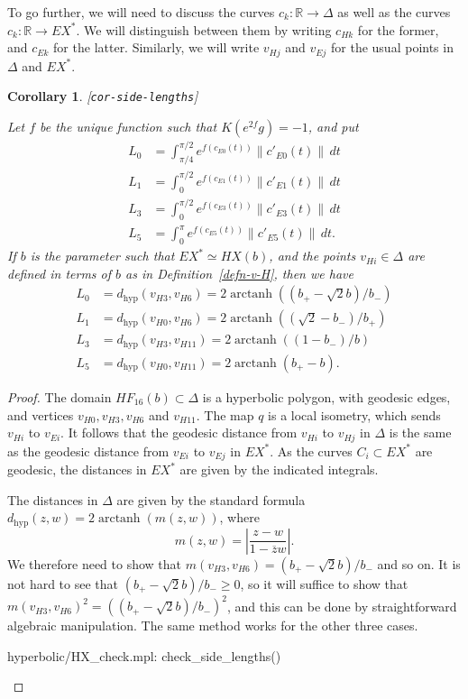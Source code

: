 \documentclass[reqno]{amsart}
\newcommand{\lbl}[1]{\label{#1}\textup{[\texttt{#1}]}\par}
\newcommand{\lbl}{\label}
\newcommand{\arctanh}	{\operatorname{arctanh}}
\newcommand{\Dl}        {\Delta}
\newcommand{\R}         {{\mathbb{R}}}
\newcommand{\ov}[1]     {\overline{#1}}
\newcommand{\rt}        {\sqrt{2}}
\newcommand{\dhyp}      {d_{\text{hyp}}}
\renewcommand{\:}{\colon}
\newtheorem{corollary}[theorem]{Corollary}
\theoremstyle{definition}
\begin{document}
To go further, we will need to discuss the curves $c_k\:\R\to\Dl$ as
well as the curves $c_k\:\R\to EX^*$.  We will distinguish between
them by writing $c_{Hk}$ for the former, and $c_{Ek}$ for the latter.
Similarly, we will write $v_{Hj}$ and $v_{Ej}$ for the usual points in
$\Dl$ and $EX^*$.

\begin{corollary}\lbl{cor-side-lengths}
 Let $f$ be the unique function such that $K(e^{2f}g)=-1$, and put
 \begin{align*}
  L_0 &= \int_{\pi/4}^{\pi/2} e^{f(c_{E0}(t))}\|c'_{E0}(t)\|\,dt \\
  L_1 &= \int_{0}^{\pi/2} e^{f(c_{E1}(t))}\|c'_{E1}(t)\|\,dt \\
  L_3 &= \int_{0}^{\pi/2} e^{f(c_{E3}(t))}\|c'_{E3}(t)\|\,dt \\
  L_5 &= \int_{0}^{\pi} e^{f(c_{E5}(t))}\|c'_{E5}(t)\|\,dt.
 \end{align*}
 If $b$ is the parameter such that $EX^*\simeq HX(b)$, and the points
 $v_{Hi}\in\Dl$ are defined in terms of $b$ as in
 Definition~\ref{defn-v-H}, then we have
 \begin{align*}
  L_0 &= \dhyp(v_{H3},v_{H6})  = 2\arctanh((b_+-\rt b)/b_-) \\
  L_1 &= \dhyp(v_{H0},v_{H6})  = 2\arctanh((\rt-b_-)/b_+) \\
  L_3 &= \dhyp(v_{H3},v_{H11}) = 2\arctanh((1-b_-)/b) \\
  L_5 &= \dhyp(v_{H0},v_{H11}) = 2\arctanh(b_+-b).
 \end{align*}
\end{corollary}
\begin{proof}
 The domain $HF_{16}(b)\subset\Dl$ is a hyperbolic polygon, with
 geodesic edges, and vertices $v_{H0},v_{H3},v_{H6}$ and $v_{H11}$.
 The map $q$ is a local isometry, which sends $v_{Hi}$ to $v_{Ei}$.
 It follows that the geodesic distance from $v_{Hi}$ to $v_{Hj}$ in
 $\Dl$ is the same as the geodesic distance from $v_{Ei}$ to $v_{Ej}$
 in $EX^*$.  As the curves $C_i\subset EX^*$ are geodesic, the
 distances in $EX^*$ are given by the indicated integrals.

 The distances in $\Dl$ are given by the standard formula
 $\dhyp(z,w)=2\arctanh(m(z,w))$, where 
 \[ m(z,w) = \left|\frac{z-w}{1-\ov{z}w}\right|. \]
 We therefore need to show that $m(v_{H3},v_{H6})=(b_+-\rt b)/b_-$ and
 so on.  It is not hard to see that $(b_+-\rt b)/b_-\geq 0$, so it
 will suffice to show that $m(v_{H3},v_{H6})^2=((b_+-\rt b)/b_-)^2$,
 and this can be done by straightforward algebraic manipulation.  The
 same method works for the other three cases.
 \begin{checks}
  hyperbolic/HX_check.mpl: check_side_lengths()
 \end{checks}
\end{proof}
\end{document}

